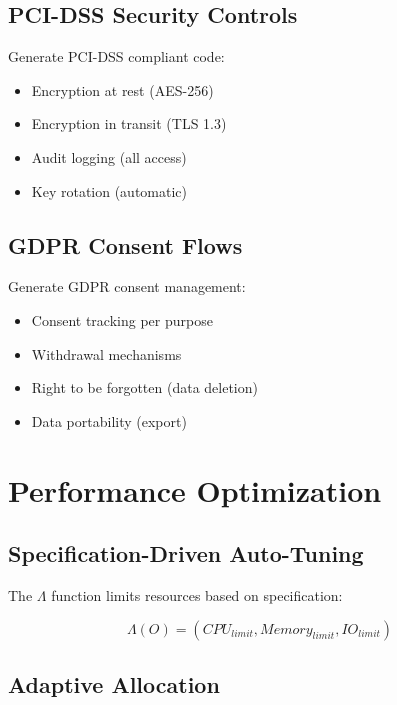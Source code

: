 \subsection{PCI-DSS Security Controls}

Generate PCI-DSS compliant code:
\begin{itemize}
    \item Encryption at rest (AES-256)
    \item Encryption in transit (TLS 1.3)
    \item Audit logging (all access)
    \item Key rotation (automatic)
\end{itemize}

\subsection{GDPR Consent Flows}

Generate GDPR consent management:
\begin{itemize}
    \item Consent tracking per purpose
    \item Withdrawal mechanisms
    \item Right to be forgotten (data deletion)
    \item Data portability (export)
\end{itemize}

\section{Performance Optimization}

\subsection{Specification-Driven Auto-Tuning}

The \(\Lambda\) function limits resources based on specification:

\begin{definition}
    \begin{equation}
        \Lambda(O) = (CPU_{limit}, Memory_{limit}, IO_{limit})
    \end{equation}
\end{definition}

\subsection{Adaptive Allocation}

